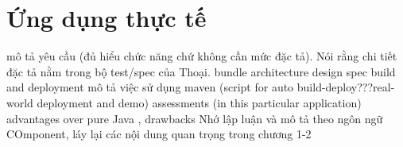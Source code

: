 \chapter{Ứng dụng thực tế}
 mô tả yêu cầu (đủ hiểu chức năng chứ không cần mức đặc tả). Nói rằng chi tiết đặc tả nằm trong bộ test/spec của Thoại.
bundle architecture
design spec
build and deployment mô tả việc sử dụng maven (script for auto build-deploy???real-world deployment and demo)
assessments (in this particular application) advantages over pure Java , drawbacks
Nhớ lập luận và mô tả theo ngôn ngữ COmponent, láy lại các nội dung quan trọng trong chương 1-2